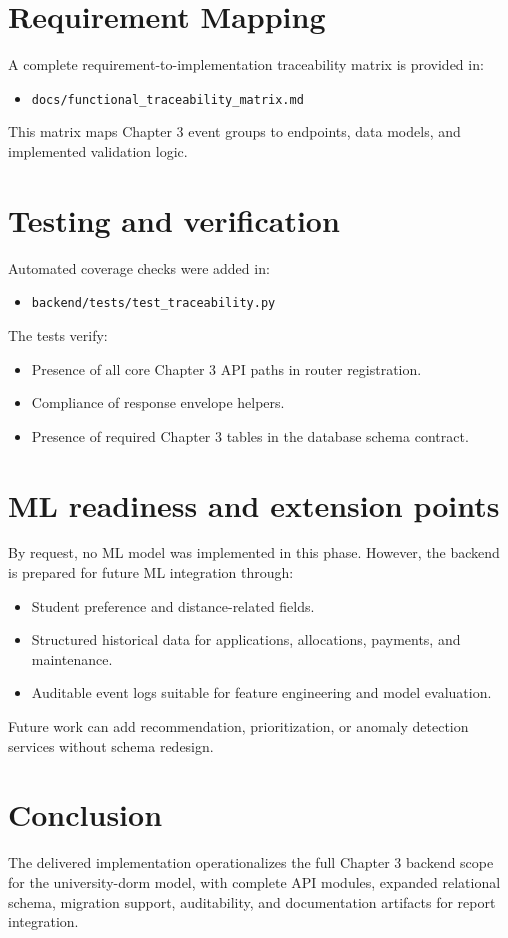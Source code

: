 \section{Requirement Mapping}
A complete requirement-to-implementation traceability matrix is provided in:
\begin{itemize}
  \item \texttt{docs/functional\_traceability\_matrix.md}
\end{itemize}
This matrix maps Chapter 3 event groups to endpoints, data models, and implemented validation logic.

\section{Testing and verification}
Automated coverage checks were added in:
\begin{itemize}
  \item \texttt{backend/tests/test\_traceability.py}
\end{itemize}
The tests verify:
\begin{itemize}
  \item Presence of all core Chapter 3 API paths in router registration.
  \item Compliance of response envelope helpers.
  \item Presence of required Chapter 3 tables in the database schema contract.
\end{itemize}

\section{ML readiness and extension points}
By request, no ML model was implemented in this phase. However, the backend is prepared for future ML integration through:
\begin{itemize}
  \item Student preference and distance-related fields.
  \item Structured historical data for applications, allocations, payments, and maintenance.
  \item Auditable event logs suitable for feature engineering and model evaluation.
\end{itemize}
Future work can add recommendation, prioritization, or anomaly detection services without schema redesign.

\section{Conclusion}
The delivered implementation operationalizes the full Chapter 3 backend scope for the university-dorm model, with complete API modules, expanded relational schema, migration support, auditability, and documentation artifacts for report integration.
